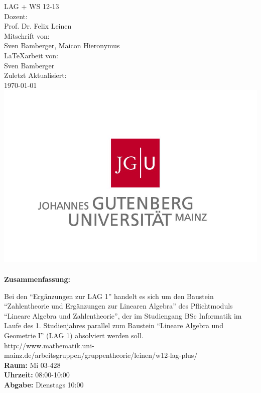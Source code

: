 \begin{titlepage}
\center
\Large LAG + WS 12-13\large \\[2em]
Dozent:\\Prof. Dr. Felix Leinen\\[2em]
Mitschrift von:\\Sven Bamberger, Maicon Hieronymus\\[2em]
\LaTeX{arbeit} von:\\Sven Bamberger\\[2em]
Zuletzt Aktualisiert:\\\today\\
\includegraphics[scale=.2]{front/pics/Logo.jpg}\\\quad\\
\Large \textbf{Zusammenfassung:}\\[1em]
\parbox{0.75\textwidth}{\large
Bei den "`Ergänzungen zur LAG 1"' handelt es sich um den Baustein "`Zahlentheorie und Ergänzungen zur Linearen Algebra"' des Pflichtmoduls "`Lineare Algebra und Zahlentheorie"', der im Studiengang BSc Informatik im Laufe des 1. Studienjahres parallel zum Baustein "`Lineare Algebra und Geometrie I"' (LAG 1) absolviert werden soll.\\
http://www.mathematik.uni-mainz.de/arbeitsgruppen/gruppentheorie/leinen/w12-lag-plus/\\
\textbf{Raum:} Mi 03-428\\
\textbf{Uhrzeit:} 08:00-10:00\\
\textbf{Abgabe:} Dienstags 10:00\\
}
\end{titlepage}